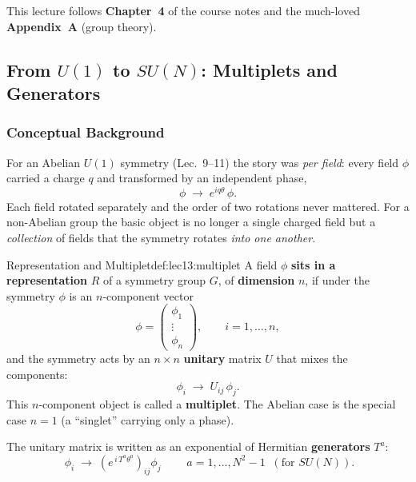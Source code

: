 \documentclass[../main.tex]{subfiles}
\begin{document}
This lecture follows \textbf{Chapter~4} of the course notes and the much-loved \textbf{Appendix~A} (group theory).

\subsection{From $U(1)$ to $SU(N)$: Multiplets and Generators}\label{sec:lec13:multiplets}

\subsubsection*{Conceptual Background}

For an Abelian $U(1)$ symmetry (Lec.~9--11) the story was \emph{per field}: every field $\phi$ carried a charge $q$ and transformed by an independent phase,
\begin{equation}
  \phi \;\to\; e^{iq\theta}\,\phi .
  \label{eq:lec13:u1transf}
\end{equation}
Each field rotated separately and the order of two rotations never mattered. For a non-Abelian group the basic object is no longer a single charged field but a \emph{collection} of fields that the symmetry rotates \emph{into one another}.

\begin{Definition}{Representation and Multiplet}{def:lec13:multiplet}
A field $\phi$ \textbf{sits in a representation} $R$ of a symmetry group $G$, of \textbf{dimension} $n$, if under the symmetry $\phi$ is an $n$-component vector
\begin{equation*}
  \phi = \begin{pmatrix}\phi_1\\ \vdots \\ \phi_n\end{pmatrix},
  \qquad i = 1,\dots,n ,
\end{equation*}
and the symmetry acts by an $n\times n$ \textbf{unitary} matrix $U$ that mixes the components:
\begin{equation*}
  \phi_i \;\to\; U_{ij}\,\phi_j .
\end{equation*}
This $n$-component object is called a \textbf{multiplet}. The Abelian case is the special case $n=1$ (a ``singlet'' carrying only a phase).
\end{Definition}

The unitary matrix is written as an exponential of Hermitian \textbf{generators} $T^a$:
\begin{equation}
  \boxed{\;\phi_i \;\to\; \left(e^{\,i\,T^a\theta^a}\right)_{ij}\phi_j\;}
  \qquad
  a = 1,\dots,N^2-1 \;\;(\text{for }SU(N)).
  \label{eq:lec13:nonabtransf}
\end{equation}
\end{document}
